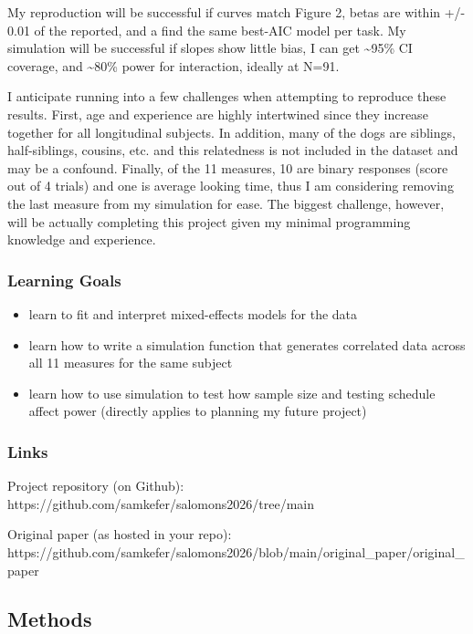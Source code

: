 \documentclass[
  letterpaper,
  DIV=11,
  numbers=noendperiod]{scrartcl}
\providecommand{\tightlist}{%
  \setlength{\itemsep}{0pt}\setlength{\parskip}{0pt}}
\begin{document}
My reproduction will be successful if curves match Figure 2, betas are
within +/- 0.01 of the reported, and a find the same best-AIC model per
task. My simulation will be successful if slopes show little bias, I can
get \textasciitilde95\% CI coverage, and \textasciitilde80\% power for
interaction, ideally at N=91.

I anticipate running into a few challenges when attempting to reproduce
these results. First, age and experience are highly intertwined since
they increase together for all longitudinal subjects. In addition, many
of the dogs are siblings, half-siblings, cousins, etc. and this
relatedness is not included in the dataset and may be a confound.
Finally, of the 11 measures, 10 are binary responses (score out of 4
trials) and one is average looking time, thus I am considering removing
the last measure from my simulation for ease. The biggest challenge,
however, will be actually completing this project given my minimal
programming knowledge and experience.

\subsubsection{Learning Goals}\label{learning-goals}

\begin{itemize}
\tightlist
\item
  learn to fit and interpret mixed-effects models for the data
\item
  learn how to write a simulation function that generates correlated
  data across all 11 measures for the same subject
\item
  learn how to use simulation to test how sample size and testing
  schedule affect power (directly applies to planning my future project)
\end{itemize}

\subsubsection{Links}\label{links}

Project repository (on Github):
https://github.com/samkefer/salomons2026/tree/main

Original paper (as hosted in your repo):
https://github.com/samkefer/salomons2026/blob/main/original\_paper/original\_paper

\subsection{Methods}\label{methods}
\end{document}
